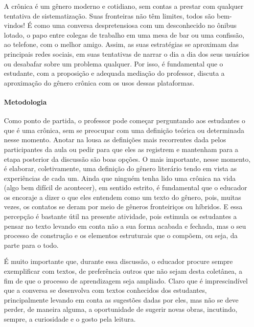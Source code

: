 \documentclass[12pt]{extarticle}
\begin{document}
A crônica é um gênero moderno e cotidiano, sem contas a prestar com
qualquer tentativa de sistematização. Suas fronteiras não têm limites,
todos são bem-vindos! É como uma conversa despretensiosa com um
desconhecido no ônibus lotado, o papo entre colegas de trabalho em uma
mesa de bar ou uma confissão, ao telefone, com o melhor amigo. Assim, as
suas estratégias se aproximam das principais redes sociais, em suas
tentativas de narrar o dia a dia dos seus usuários ou desabafar sobre um
problema qualquer. Por isso, é fundamental que o estudante, com a
proposição e adequada mediação do professor, discuta a aproximação do
gênero crônica com os usos dessas plataformas.

\paragraph{Metodologia} Como ponto de partida, o professor pode começar
perguntando aos estudantes o que é uma crônica, sem se preocupar com uma
definição teórica ou determinada nesse momento. Anotar na lousa as
definições mais recorrentes dada pelos participantes da aula ou pedir
para que eles as registrem e mantenham para a etapa posterior da
discussão são boas opções. O mais importante, nesse momento, é elaborar,
coletivamente, uma definição do gênero literário tendo em vista as
experiências de cada um. Ainda que ninguém tenha lido uma crônica na
vida (algo bem difícil de acontecer), em sentido estrito, é fundamental
que o educador os encoraje a dizer o que eles entendem como um texto do
gênero, pois, muitas vezes, os contatos se deram por meio de gêneros
fronteiriços ou híbridos. E essa percepção é bastante útil na presente
atividade, pois estimula os estudantes a pensar no texto levando em
conta não a sua forma acabada e fechada, mas o seu processo de
construção e os elementos estruturais que o compõem, ou seja, da parte
para o todo.

É muito importante que, durante essa discussão, o educador procure
sempre exemplificar com textos, de preferência outros que não sejam
desta coletânea, a fim de que o processo de aprendizagem seja ampliado.
Claro que é imprescindível que a conversa se desenvolva com textos
conhecidos dos estudantes, principalmente levando em conta as sugestões
dadas por eles, mas não se deve perder, de maneira alguma, a
oportunidade de sugerir novas obras, incutindo, sempre, a curiosidade e
o gosto pela leitura.
\end{document}
